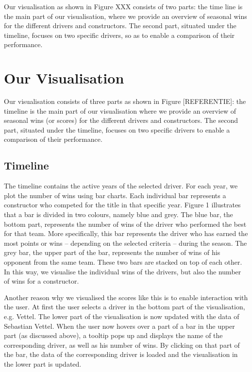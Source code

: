\documentclass{sigchi}
\begin{document}
Our visualisation as shown in Figure XXX consists of two parts: the time line is the main part of our visualisation, where we provide an overview of seasonal wins for the different drivers and constructors. The second part, situated under the timeline, focuses on two specific drivers, so as to enable a comparison of their performance. 

\section{Our Visualisation}
Our visualisation consists of three parts as shown in Figure [REFERENTIE]: the timeline is the main part of our visualisation where we provide an overview of seasonal wins (or scores) for the different drivers and constructors. The second part, situated under the timeline, focuses on two specific drivers to enable a comparison of their performance.  

\subsection{Timeline}

The timeline contains the active years of the selected driver. For each year, we plot the number of wins using bar charts. Each individual bar represents a constructor who competed for the title in that specific year. Figure 1 illustrates that a bar is divided in two colours, namely blue and grey. The blue bar, the bottom part, represents the number of wins of the driver who performed the best for that team. More specifically, this bar represents the driver who has earned the most points or wins – depending on the selected criteria – during the season. The grey bar, the upper part of the bar, represents the number of wins of his opponent from the same team. These two bars are stacked on top of each other. In this way, we visualise the individual wins of the drivers, but also the number of wins for a constructor. 
 
Another reason why we visualised the scores like this is to enable interaction with the user. At first the user selects a driver in the bottom part of the visualisation, e.g. Vettel. The lower part of the visualisation is now updated with the data of Sebastian Vettel. When the user now hovers over a part of a bar in the upper part (as discussed above), a tooltip pops up and displays the name of the corresponding driver, as well as his number of wins.  By clicking on that part of the bar, the data of the corresponding driver is loaded and the visualisation in the lower part is updated. 
\end{document}
